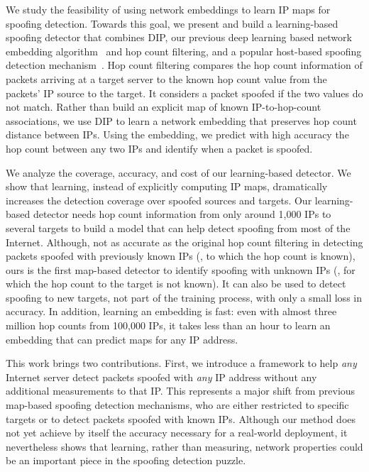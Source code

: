 We study the feasibility of using network embeddings to learn IP maps for spoofing detection. Towards this goal, we present and build a learning-based spoofing detector that combines DIP, our previous deep learning based network embedding algorithm~\citep{dip,dip-ccr} and hop count filtering, and a popular host-based spoofing detection mechanism~\citep{hcf}. Hop count filtering compares the hop count information of packets arriving at a target server to the known hop count value from the packets' IP source to the target. It considers a packet spoofed if the two values do not match. 
%
Rather than build an explicit map of known IP-to-hop-count associations, we use DIP to learn a network embedding that preserves hop count distance between IPs. Using the embedding, we predict with high accuracy the hop count between any two IPs and identify when a packet is spoofed.

We analyze the coverage, accuracy, and cost of our learning-based detector. We show that learning, instead of explicitly computing IP maps, dramatically increases the detection coverage over spoofed sources and targets. Our learning-based detector needs hop count information from only around 1,000 IPs to several targets to build a model that can help detect spoofing from most of the Internet. Although, not as accurate as the original hop count filtering in detecting packets spoofed with previously known IPs (\ie{}, to which the hop count is known), ours is the first map-based detector to identify spoofing with unknown IPs (\ie{}, for which the hop count to the target is not known). It can also be used to detect spoofing to new targets, not part of the training process, with only a small loss in accuracy. In addition, learning an embedding is fast: even with almost three million hop counts from 100,000 IPs, it takes less than an hour to learn an embedding that can predict maps for any IP address.

This work brings two contributions. First, we introduce a framework to help {\em any} Internet server detect packets spoofed with {\em any} IP address without any additional measurements to that IP. This represents a major shift from previous map-based spoofing detection mechanisms, who are either restricted to specific targets or to detect packets spoofed with known IPs. Although our method does not yet achieve by itself the accuracy necessary for a real-world deployment, it nevertheless shows that learning, rather than measuring, network properties could be an important piece in the spoofing detection puzzle.


